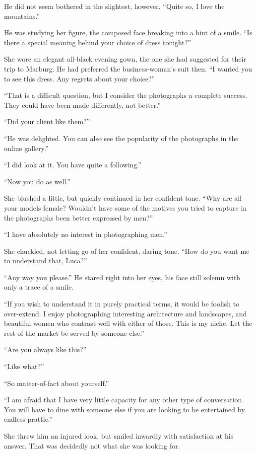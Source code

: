 He did not seem bothered in the slightest, however. ``Quite so, I love the mountains.''

He was studying her figure, the composed face breaking into a hint of a smile. ``Is there a special meaning behind your choice of dress tonight?''

She wore an elegant all-black evening gown, the one she had suggested for their trip to Marburg. He had preferred the business-woman's suit then. ``I wanted you to see this dress. Any regrets about your choice?''

``That is a difficult question, but I consider the photographs a complete success. They could have been made differently, not better.''

``Did your client like them?''

``He was delighted. You can also see the popularity of the photographs in the online gallery.''

``I did look at it. You have quite a following.''

``Now you do as well.''

She blushed a little, but quickly continued in her confident tone. ``Why are all your models female? Wouldn't have some of the motives you tried to capture in the photographs been better expressed by men?''

``I have absolutely no interest in photographing men.''

She chuckled, not letting go of her confident, daring tone. ``How do you want me to understand that, Luca?''

``Any way you please.'' He stared right into her eyes, his face still solemn with only a trace of a smile.

``If you wish to understand it in purely practical terms, it would be foolish to over-extend. I enjoy photographing interesting architecture and landscapes, and beautiful women who contrast well with either of those. This is my niche. Let the rest of the market be served by someone else.''

``Are you always like this?''

``Like what?''

``So matter-of-fact about yourself.''

``I am afraid that I have very little capacity for any other type of conversation. You will have to dine with someone else if you are looking to be entertained by endless prattle.''

She threw him an injured look, but smiled inwardly with satisfaction at his answer. That was decidedly not what she was looking for.

